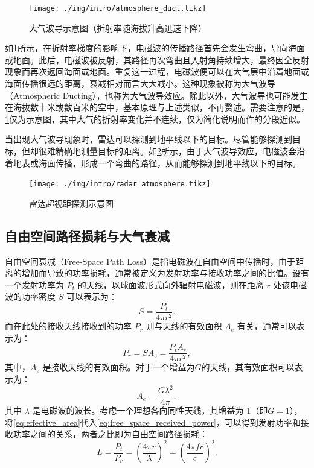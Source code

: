 \begin{figure}[htb!]
    \centering
    \texttt{[image: ./img/intro/atmosphere\_duct.tikz]}
    \caption{大气波导示意图（折射率随海拔升高迅速下降）}
    \label{fig_chp1_atmosphere_duct}
\end{figure}

如\cref{fig_chp1_atmosphere_duct}所示，在折射率梯度的影响下，电磁波的传播路径首先会发生弯曲，导向海面或地面。此后，电磁波被反射，其路径再次弯曲且入射角持续增大，最终因全反射现象而再次返回海面或地面。重复这一过程，电磁波便可以在大气层中沿着地面或海面传播很远的距离，衰减相对而言大大减小。这种现象被称为大气波导（Atmospheric Ducting），也称为大气波导效应。除此以外，大气波导也可能发生在海拔数十米或数百米的空中，基本原理与上述类似，不再赘述。需要注意的是，\cref{fig_chp1_atmosphere_duct}仅为示意图，其中大气的折射率变化并不连续，仅为简化说明而作的分段近似。

当出现大气波导现象时，雷达可以探测到地平线以下的目标。尽管能够探测到目标，但却很难精确地测量目标的距离。如\cref{fig_chp1_radar_ducting}所示，由于大气波导效应，电磁波会沿着地表或海面传播，形成一个弯曲的路径，从而能够探测到地平线以下的目标。
\begin{figure}[htb!]
    \centering
    \texttt{[image: ./img/intro/radar\_atmosphere.tikz]}
    \caption{雷达超视距探测示意图}
    \label{fig_chp1_radar_ducting}
\end{figure}



\subsection{自由空间路径损耗与大气衰减}

自由空间衰减（Free-Space Path Loss）是指电磁波在自由空间中传播时，由于距离的增加而导致的功率损耗，通常被定义为发射功率与接收功率之间的比值。设有一个发射功率为 $P_t$ 的天线，以球面波形式向外辐射电磁波，则在距离 $r$ 处该电磁波的功率密度 $S$ 可以表示为：
\begin{equation*}
    S = \frac{P_t}{4 \pi r^2}.
    \label{eq:free_space_power_density}
\end{equation*}
而在此处的接收天线接收到的功率 $P_r$ 则与天线的有效面积 $A_e$ 有关，通常可以表示为：
\begin{equation}
    P_r = S A_e = \frac{P_t A_e}{4 \pi r^2},
    \label{eq:free_space_received_power}
\end{equation}
其中，$A_e$ 是接收天线的有效面积。对于一个增益为\( G \)的天线，其有效面积可以表示为：
\begin{equation}
    A_e = \frac{G \lambda^2}{4 \pi},
    \label{eq:effective_area}
\end{equation}
其中 $\lambda$ 是电磁波的波长。考虑一个理想各向同性天线，其增益为 1（即$G=1$），将\cref{eq:effective_area}代入\cref{eq:free_space_received_power}，可以得到发射功率和接收功率之间的关系，两者之比即为自由空间路径损耗：
\begin{equation}
    L = \frac{P_t}{P_r} = \left( \frac{4 \pi r}{\lambda} \right)^2 = \left( \frac{4 \pi f r}{c} \right)^2.
    \label{eq:free_space_received_power_final}
\end{equation}

